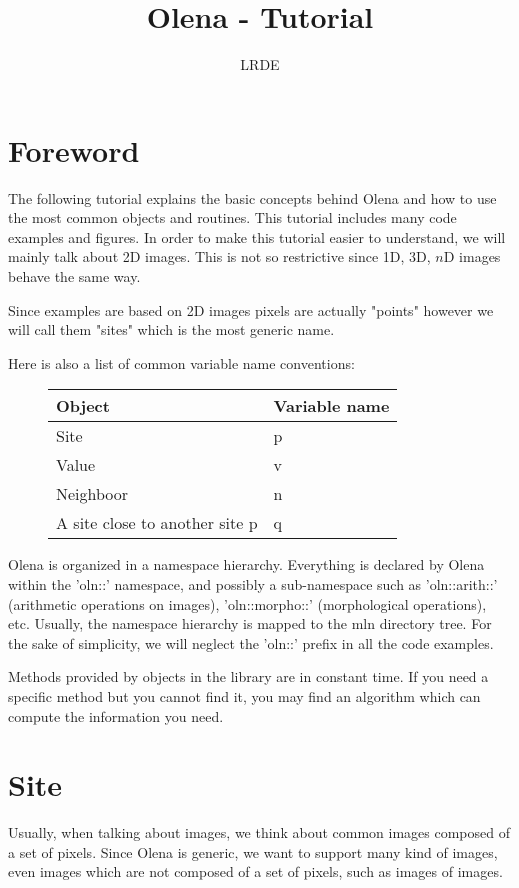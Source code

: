 \documentclass{report}
\title{Olena - Tutorial
}
\author{LRDE}
\date{}
\begin{document}
\tableofcontents

\chapter*{Foreword}

The following tutorial explains the basic concepts behind Olena and how to use 
the most common objects and routines.
This tutorial includes many code examples and figures. In order to make this
tutorial easier to understand, we will mainly talk about 2D images. This is
not so restrictive since 1D, 3D, $n$D images behave the same way.


Since examples are based on 2D images pixels are actually "points" however we
will call them "sites" which is the most generic name.\newline

Here is also a list of common variable name conventions:
\begin{figure}[ht!]
  \begin{tabular}{|l|l|}
  \hline
  \textbf{Object} & \textbf{Variable name} \\ \hline
  Site & p                            \\ \hline
  Value & v                           \\ \hline
  Neighboor & n                       \\ \hline
  A site close to another site p & q  \\ \hline
  \end{tabular}
\end{figure}

Olena is organized in a namespace hierarchy.  Everything is declared by Olena
within the 'oln::' namespace, and possibly a sub-namespace such as
'oln::arith::' (arithmetic operations on images), 'oln::morpho::' (morphological
operations), etc. Usually, the namespace hierarchy is mapped to the mln
directory tree. For the sake of simplicity, we will neglect the 'oln::'
prefix in all the code examples.

Methods provided by objects in the library are in constant time. If you need
a specific method but you cannot find it, you may find an algorithm which can
compute the information you need.

\clearpage
\newpage
\chapter{Site}

Usually, when talking about images, we think about common images composed of a
set of pixels.
Since Olena is generic, we want to support many kind of images, even images
which are not composed of a set of pixels, such as images of images.
\end{document}
